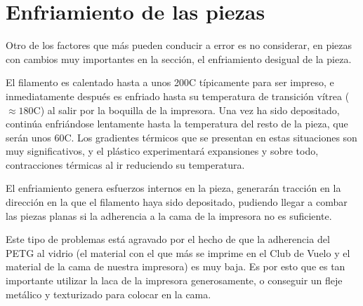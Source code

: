 \section{Enfriamiento de las piezas}
Otro de los factores que más pueden conducir a error es no considerar, en piezas con cambios muy importantes en la sección, el enfriamiento desigual de la pieza.
\par El filamento es calentado hasta a unos 200\textdegree{}C típicamente para ser impreso, e inmediatamente después es enfriado hasta su temperatura de transición vítrea ($\approx 180$\textdegree{}C) al salir por la boquilla de la impresora. Una vez ha sido depositado, continúa enfriándose lentamente hasta la temperatura del resto de la pieza, que serán unos 60\textdegree{}C. Los gradientes térmicos que se presentan en estas situaciones son muy significativos, y el plástico experimentará expansiones y sobre todo, contracciones térmicas al ir reduciendo su temperatura. 
\par El enfriamiento genera esfuerzos internos en la pieza, generarán tracción en la dirección en la que el filamento haya sido depositado, pudiendo llegar a combar las piezas planas si la adherencia a la cama de la impresora no es suficiente.
\par Este tipo de problemas está agravado por el hecho de que la adherencia del PETG al vidrio (el material con el que más se imprime en el Club de Vuelo y el material de la cama de nuestra impresora) es muy baja. Es por esto que es tan importante utilizar la laca de la impresora generosamente, o conseguir un fleje metálico y texturizado para colocar en la cama. 